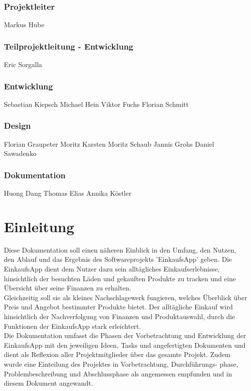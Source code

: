 \documentclass[12pt,a4paper]{article}
\begin{document}
\subsubsection*{Projektleiter}
Markus Hube
\subsubsection*{Teilprojektleitung - Entwicklung}
Eric Sorgalla
\subsubsection*{Entwicklung}
Sebastian Kiepsch
\newline
Michael Hein
\newline
Viktor Fuchs
\newline
Florian Schmitt 
\subsubsection*{Design}
Florian Graupeter
\newline
Moritz Karsten
\newline
Moritz Schaub
\newline
Jannis Grohs
\newline
Daniel Sawadenko 
\subsubsection*{Dokumentation}
Huong Dang
\newline
Thomas Elias
\newline
Annika Köstler
\newpage


\section*{Einleitung}
Diese Dokumentation soll einen näheren Einblick in den Umfang, den Nutzen, den Ablauf und das Ergebnis des Softwareprojekts 'EinkaufsApp' geben.  
Die EinkaufsApp dient dem Nutzer dazu sein alltägliches Einkaufserlebnisse, hinsichtlich der besuchten Läden und gekauften Produkte zu tracken und eine Übersicht über seine Finanzen zu erhalten.
\\
Gleichzeitig soll sie als kleines Nachschlagewerk fungieren, welches Überblick über Preis und Angebot bestimmter Produkte bietet.
Der alltägliche Einkauf wird hinsichtlich der Nachverfolgung von Finanzen und Produktauswahl, durch die Funktionen der EinkaufsApp stark erleichtert.
\\
Die Dokumentation umfasst die Phasen der Vorbetrachtung und Entwicklung der EinkaufsApp mit den jeweiligen Ideen, Tasks und angefertigten Dokumenten und dient als Reflexion aller Projektmitglieder über das gesamte Projekt.
Zudem wurde eine Einteilung des Projektes in Vorbetrachtung, Durchführungs-
phase, Problembeschreibung und Abschlussphase als angemessen empfunden und in diesem Dokument angewandt.
\newpage
\end{document}
